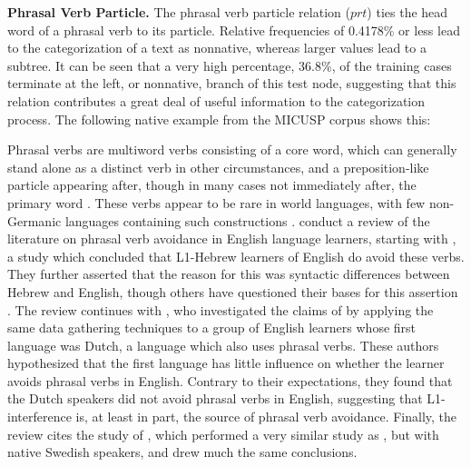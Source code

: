 \documentclass[main.tex]{subfiles}
\begin{document}

\textbf{Phrasal Verb Particle.} The phrasal verb particle relation ($prt$) ties the head word of a phrasal verb to its particle. Relative frequencies of 0.4178\% or less lead to the categorization of a text as nonnative, whereas larger values lead to a subtree. It can be seen that a very high percentage, 36.8\%, of the training cases terminate at the left, or nonnative, branch of this test node, suggesting that this relation contributes a great deal of useful information to the categorization process. The following native example from the MICUSP corpus shows this:
\newline\newline{}
\newline

Phrasal verbs are multiword verbs consisting of a core word, which can generally stand alone as a distinct verb in other circumstances, and a preposition-like particle appearing after, though in many cases not immediately after, the primary word \citep{celce-murcia:1999}. These verbs appear to be rare in world languages, with few non-Germanic languages containing such constructions \citep{celce-murcia:1999}. \citet{liao:2004} conduct a review of the literature on phrasal verb avoidance in English language learners, starting with \citet{dagut:1985}, a study which concluded that L1-Hebrew learners of English do avoid these verbs. They further asserted that the reason for this was syntactic differences between Hebrew and English, though others have questioned their bases for this assertion \citep{liao:2004}. The review continues with \citet{hulstijn:1989}, who investigated the claims of \citeauthor{dagut:1985} by applying the same data gathering techniques to a group of English learners whose first language was Dutch, a language which also uses phrasal verbs. These authors hypothesized that the first language has little influence on whether the learner avoids phrasal verbs in English.  Contrary to their expectations, they found that the Dutch speakers did not avoid phrasal verbs in English, suggesting that L1-interference is, at least in part, the source of phrasal verb avoidance. Finally, the review cites the study of \citet{laufer:1993}, which performed a very similar study as \citeauthor{hulstijn:1989}, but with native Swedish speakers, and drew much the same conclusions.
\end{document}
